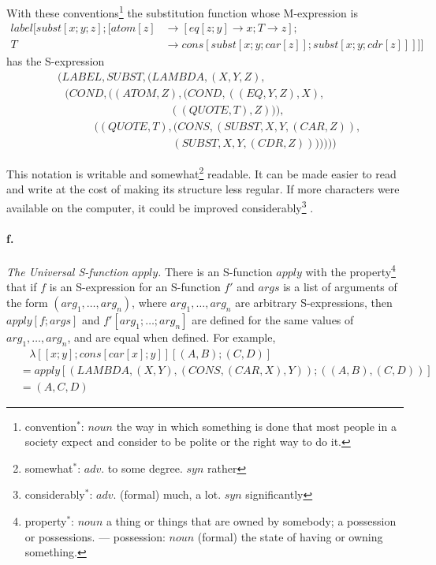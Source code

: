 \documentclass[11pt, a4paper]{article}
\begin{document}
With these
conventions\footnote{convention$^*$: $noun$ the way in which something is done
  that most people in a society expect and consider to be polite or the right
  way to do it.}
the substitution function whose M-expression is
\begin{align*}
  label[subst[x; y; z];[atom[z] &\to [eq [z; y] \to x; T \to z];\\
                        T &\to cons[subst[x; y; car[z]]; subst[x; y; cdr[z]]]]]
\end{align*}
has the S-expression
\begin{align*}
  &(LABEL, SUBST, (LAMBDA, (X, Y, Z),                                         \\
  &\ \ \ (COND, ((ATOM, Z), (COND, ((EQ, Y, Z), X),                           \\
  &\ \ \ \ \ \ \ \ \ \ \ \ \ \ \ \ \ \ \ \ \ \ \ \ \ \ \ \ \ \ \ \ \ \ \ \ \ \
  \ \ \ \ \ \ \ \ ((QUOTE, T), Z))),                                          \\
  &\ \ \ \ \ \ \ \ \ \ \ \ \ \ \ ((QUOTE, T), (CONS, (SUBST, X, Y, (CAR, Z)), \\
  &\ \ \ \ \ \ \ \ \ \ \ \ \ \ \ \ \ \ \ \ \ \ \ \ \ \ \ \ \ \ \ \ \ \ \ \ \ \
  \ \ \ \ \ \ \ \ \ (SUBST, X, Y, (CDR, Z)))))))
\end{align*}

This notation is writable and
somewhat\footnote{somewhat$^*$: $adv.$ to some degree. $syn$ rather}
readable. It can be made easier to read
and write at the cost of making its structure less regular. If more characters
were available on the computer, it could be improved
considerably\footnote{considerably$^*$: $adv.$ (formal) much, a lot. $syn$
  significantly}
.

\paragraph{f.}\textit{The Universal S-function $apply$.}
There is an S-function $apply$ with the
property\footnote{property$^*$: $noun$ a thing or things that are owned by
  somebody; a possession or possessions. --- possession: $noun$ (formal) the
  state of having or owning something.}
that if $f$ is an S-expression
for an S-function $f'$ and $args$ is a list of arguments of the form $(arg_1,
\ldots, arg_n)$, where $arg_1, \ldots, arg_n$ are arbitrary S-expressions, then
$apply[f; args]$ and $f'[arg_1; \ldots; arg_n]$ are defined for the same values
of $arg_1, \ldots, arg_n$, and are equal when defined. For example,
\begin{align*}
  &\ \ \ \ \lambda[[x; y]; cons[car[x]; y]][(A, B); (C, D)]\\
  &= apply[(LAMBDA, (X, Y), (CONS, (CAR, X), Y)); ((A, B), (C, D))]\\
  &= (A, C, D)
\end{align*}
\end{document}
